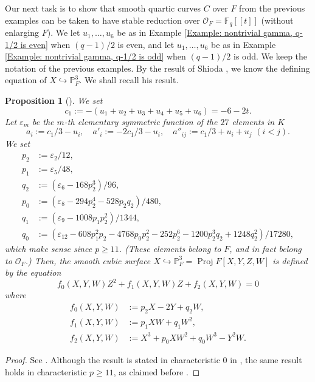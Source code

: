 \documentclass{amsart}
\newtheorem{prop}{Proposition}[section]
\theoremstyle{definition}
\theoremstyle{remark}
\DeclareMathOperator{\Proj}{Proj}
\newcommand{\PP}{\mathbb P}
\newcommand{\Fq}{\mathbb F_q}
\begin{document}
Our next task is to show that
smooth quartic curves $C$ over $F$ from the previous examples can be taken to have stable reduction over $\mathcal{O}_F=\Fq[[t]]$ (without enlarging $F$).
We let $u_1, \dotsc, u_6$ be as in Example \ref{Example: nontrivial gamma, q-1/2 is even} when $(q-1)/2$ is even, and let $u_1, \dotsc, u_6$ be as in Example \ref{Example: nontrivial gamma, q-1/2 is odd} when $(q-1)/2$ is odd.
We keep the notation of the previous examples.
By the result of Shioda \cite[Theorem 14]{Shioda}, we know the defining equation of $X \hookrightarrow \PP^3_{F}$.
We shall recall his result.

\begin{prop}[{\cite[Theorem 14]{Shioda}}]\label{Proposition:Shioda defining equation}
    We set
\[
c_1 := -(u_1+u_2+u_3+u_4+u_5+u_6)=-6-2t.
\]
Let $\varepsilon_m$ be the $m$-th elementary symmetric function of the $27$ elements in $K$
\[
a_i:=c_1/3 - u_i, \quad a'_i:=-2c_1/3 - u_i, \quad a''_{ij}:=c_1/3+u_i+u_j \, \, (i < j).
\]
We set
\begin{align*}
        p_2&:= \varepsilon_2/12, \\
        p_1&:= \varepsilon_5/48, \\
        q_2&:= (\varepsilon_6-168p^3_2)/96, \\
        p_0&:= (\varepsilon_8-294 p^4_2-528 p_2 q_2)/480, \\
        q_1&:= (\varepsilon_9 - 1008 p_1 p^2_2)/1344, \\
        q_0&:= (\varepsilon_{12}-608 p^2_1 p_2-4768 p_0 p^2_2-252 p^6_2-1200 p^3_2 q_2+1248 q^2_2)/17280,
\end{align*}
which make sense since $p \geq 11$.
(These elements belong to $F$, and in fact belong to $\mathcal{O}_F$.)
Then, the smooth cubic surface $X \hookrightarrow \PP^3_{F}= \Proj F[X, Y, Z, W]$
is defined by the equation
\[
f_0(X, Y, W)Z^2 + f_1(X, Y, W)Z + f_2(X, Y, W)=0
\]
where
\begin{align*}
        f_0(X, Y, W)&:= p_2 X - 2Y + q_2 W, \\
        f_1(X, Y, W)&:= p_1 XW + q_1 W^2, \\
        f_2(X, Y, W)&:= X^3 +p_0 XW^2 + q_0 W^3 - Y^2W.
\end{align*}
\end{prop}

\begin{proof}
See \cite[Theorem 14]{Shioda}.
    Although the result is stated in characteristic $0$ in \cite{Shioda}, the same result holds in characteristic $p \geq 11$, as claimed before \cite[Lemma 13]{Shioda}.
\end{proof}
\end{document}
